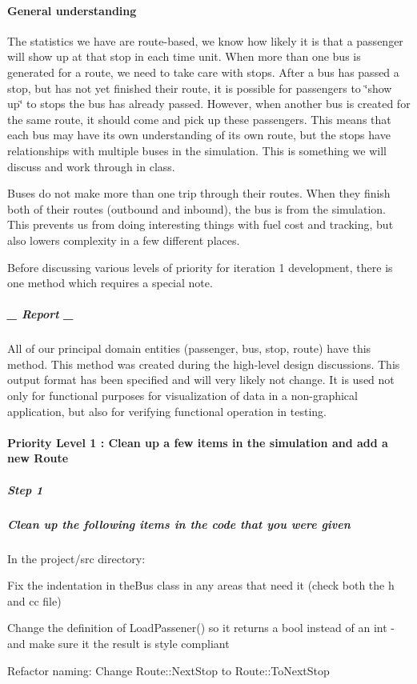 \paragraph*{General understanding}

The statistics we have are route-\/based, we know how likely it is that a passenger will show up at that stop in each time unit. When more than one bus is generated for a route, we need to take care with stops. After a bus has passed a stop, but has not yet finished their route, it is possible for passengers to \char`\"{}show up\char`\"{} to stops the bus has already passed. However, when another bus is created for the same route, it should come and pick up these passengers. This means that each bus may have its own understanding of its own route, but the stops have relationships with multiple buses in the simulation. This is something we will discuss and work through in class.

Buses do not make more than one trip through their routes. When they finish both of their routes (outbound and inbound), the bus is from the simulation. This prevents us from doing interesting things with fuel cost and tracking, but also lowers complexity in a few different places.

Before discussing various levels of priority for iteration 1 development, there is one method which requires a special note.

\subparagraph*{\+\_\+ Report \+\_\+}

All of our principal domain entities (passenger, bus, stop, route) have this method. This method was created during the high-\/level design discussions. This output format has been specified and will very likely not change. It is used not only for functional purposes for visualization of data in a non-\/graphical application, but also for verifying functional operation in testing.

\paragraph*{Priority Level 1 \+: Clean up a few items in the simulation and add a new Route}

\subparagraph*{Step 1}

\subparagraph*{Clean up the following items in the code that you were given}

In the {\ttfamily project/src} directory\+:


\begin{DoxyEnumerate}
\item Fix the indentation in the{\ttfamily Bus} class in any areas that need it (check both the {\ttfamily h} and {\ttfamily cc} file)
\item Change the definition of {\ttfamily Load\+Passener()} so it returns a {\ttfamily bool} instead of an {\ttfamily int} -\/ and make sure it the result is style compliant
\item Refactor naming\+: Change {\ttfamily Route\+::\+Next\+Stop} to {\ttfamily Route\+::\+To\+Next\+Stop}
\end{DoxyEnumerate}

